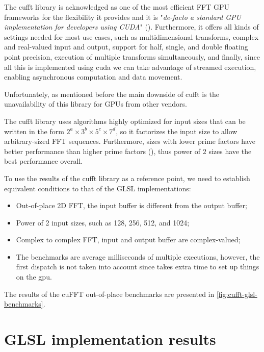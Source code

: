 \documentclass[
  oneside,
  11pt, a4paper,
  footinclude=true,
  headinclude=true,
  cleardoublepage=empty
]{scrbook}
\begin{document}
The \acrshort{cufft} library is acknowledged as one of the most efficient FFT GPU frameworks for the flexibility it provides and it is "\textit{de-facto a standard GPU
implementation for developers using CUDA}" (\cite{stvrelak2018performance}). Furthermore, it offers all kinds of settings needed for most use cases, such as multidimensional transforms, complex and real-valued input and output, support for half, single, and double floating point precision, execution of multiple transforms simultaneously, and finally, since all this is implemented using \acrshort{cuda} we can take advantage of streamed execution, enabling asynchronous computation and data movement.

Unfortunately, as mentioned before the main downside of \acrshort{cufft} is the unavailability of this library for GPUs from other vendors.
\newline

The \acrshort{cufft} library uses algorithms highly optimized for input sizes that can be written in the form $2^a \times 3^b \times 5^c \times 7^d$, so it factorizes the input size to allow arbitrary-sized FFT sequences. Furthermore, sizes with lower prime factors have better performance than higher prime factors (\cite{nvidiacufft}), thus power of $2$ sizes have the best performance overall.
\newline

To use the results of the \acrshort{cufft} library as a reference point, we need to establish equivalent conditions to that of the GLSL implementations:

\begin{itemize}
    \item Out-of-place 2D FFT, the input buffer is different from the output buffer;
    \item Power of 2 input sizes, such as 128, 256, 512, and 1024;
    \item Complex to complex FFT, input and output buffer are complex-valued;
    \item The benchmarks are average milliseconds of multiple executions, however, the first dispatch is not taken into account since  takes extra time to set up things on the \acrshort{gpu}.
\end{itemize}

The results of the cuFFT out-of-place benchmarks are presented in \autoref{fig:cufft-glsl-benchmarks}.

\section{GLSL implementation results} \label{sec:glsl-implementation-results}
\end{document}
